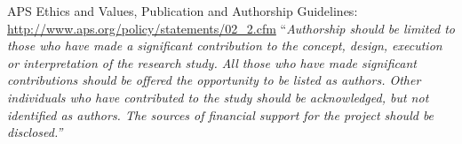 APS Ethics and Values, Publication and Authorship Guidelines:
\url{http://www.aps.org/policy/statements/02_2.cfm}
``\emph{Authorship should be limited to those who have made a significant contribution to the concept, design, execution or
interpretation of the research study.
All those who have made significant contributions should be offered the opportunity to be listed as authors.
Other individuals who have contributed to the study should be acknowledged, but not identified as authors.
The sources of financial support for the project should be disclosed.''}
